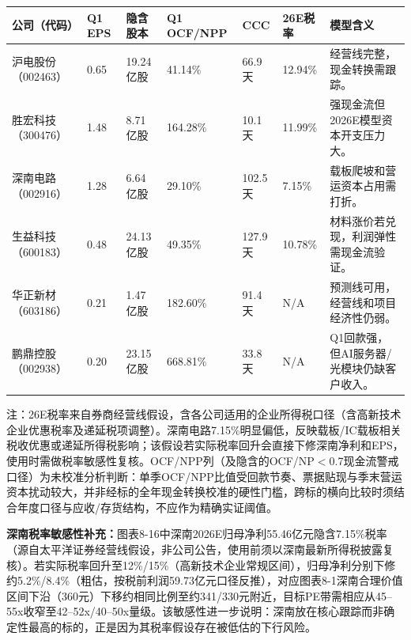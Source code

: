 \begin{exhibitbox}[图表8-16：EPS模型底座假设矩阵]
\footnotesize
\begin{tabularx}{\textwidth}{L{1.7cm}R{1.4cm}R{1.5cm}R{1.4cm}R{1.4cm}R{1.4cm}X}
\toprule
\textbf{公司（代码）} & \textbf{Q1 EPS} & \textbf{隐含股本} & \textbf{Q1 OCF/NPP} & \textbf{CCC} & \textbf{26E税率} & \textbf{模型含义} \\
\midrule
沪电股份（002463） & 0.65 & 19.24亿股 & 41.14\% & 66.9天 & 12.94\% & 经营线完整，现金转换需跟踪。 \\
胜宏科技（300476） & 1.48 & 8.71亿股 & 164.28\% & 10.1天 & 11.99\% & 强现金流但2026E模型资本开支压力大。 \\
深南电路（002916） & 1.28 & 6.64亿股 & 29.10\% & 102.5天 & 7.15\% & 载板爬坡和营运资本占用需打折。 \\
生益科技（600183） & 0.48 & 24.13亿股 & 49.35\% & 127.9天 & 10.78\% & 材料涨价若兑现，利润弹性需现金流验证。 \\
华正新材（603186） & 0.21 & 1.47亿股 & 182.60\% & 91.4天 & N/A & 预测线可用，经营线和项目经济性仍弱。 \\
鹏鼎控股（002938） & 0.20 & 23.15亿股 & 668.81\% & 33.8天 & N/A & Q1回款强，但AI服务器/光模块仍缺客户收入。 \\
\bottomrule
\end{tabularx}
\vspace{0.3em}
\scriptsize 注：26E税率来自券商经营线假设，含各公司适用的企业所得税口径（含高新技术企业优惠税率及递延税项调整）。深南电路7.15\%明显偏低，反映载板/IC载板相关税收优惠或递延所得税影响；该假设若实际税率回升会直接下修深南净利和EPS，使用时需做税率敏感性复核。OCF/NPP列（及隐含的OCF/NP$<$0.7现金流警戒口径）为未校准分析判断：单季OCF/NPP比值受回款节奏、票据贴现与季末营运资本扰动较大，并非经标的全年现金转换校准的硬性门槛，跨标的横向比较时须结合年度口径与应收/存货结构，不应作为精确实证阈值。
\end{exhibitbox}

\textbf{深南税率敏感性补充：}图表8-16中深南2026E归母净利55.46亿元隐含7.15\%税率（源自太平洋证券经营线假设，非公司公告，使用前须以深南最新所得税披露复核）。若实际税率回升至12\%/15\%（高新技术企业常规区间），归母净利分别下修约5.2\%/8.4\%（粗估，按税前利润59.73亿元口径反推），对应图表8-1深南合理价值区间下沿（360元）下移约相同比例至约341/330元附近，目标PE带需相应从45--55x收窄至42--52x/40--50x量级。该敏感性进一步说明：深南放在核心跟踪而非确定性最高的标的，正是因为其税率假设存在被低估的下行风险。

